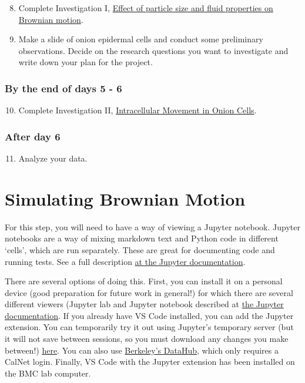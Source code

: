 \documentclass{../lab}
\begin{document}
\begin{enumerate}
    \setcounter{enumi}{7}
    \item Complete Investigation I, \hyperref[sec:InvestigationI]{Effect of particle size and fluid properties on Brownian motion}.

    \item Make a slide of onion epidermal cells and conduct some preliminary observations. Decide on the research questions you want to investigate and write down your plan for the project.
\end{enumerate}

\subsubsection{By the end of days 5 - 6}

\begin{enumerate}
    \setcounter{enumi}{9}
    \item Complete Investigation II, \hyperref[sec:InvestigationII]{Intracellular Movement in Onion Cells}.
\end{enumerate}

\subsubsection{After day 6}

\begin{enumerate}
    \setcounter{enumi}{10}
    \item Analyze your data.
\end{enumerate}

\section{Simulating Brownian Motion}
\label{sec:simulation}

For this step, you will need to have a way of viewing a Jupyter notebook. Jupyter notebooks are a way of mixing markdown text and Python code in different `cells', which are run separately. These are great for documenting code and running tests. See a full description \href{https://docs.jupyter.org/en/latest/#what-is-a-notebook}{at the Jupyter documentation}.

There are several options of doing this. First, you can install it on a personal device (good preparation for future work in general!) for which there are several different viewers (Jupyter lab and Jupyter notebook described at \href{https://docs.jupyter.org/en/latest/#where-do-i-start}{the Jupyter documentation}. If you already have VS Code installed, you can add the Jupyter extension. You can temporarily try it out using Jupyter's temporary server (but it will not save between sessions, so you must download any changes you make between!) \href{https://docs.jupyter.org/en/latest/start/index.html}{here}. You can also use \href{https://datahub.berkeley.edu/hub/login?next=%2Fhub%2F}{Berkeley's DataHub}, which only requires a CalNet login. Finally, VS Code with the Jupyter extension has been installed on the BMC lab computer.
\end{document}
